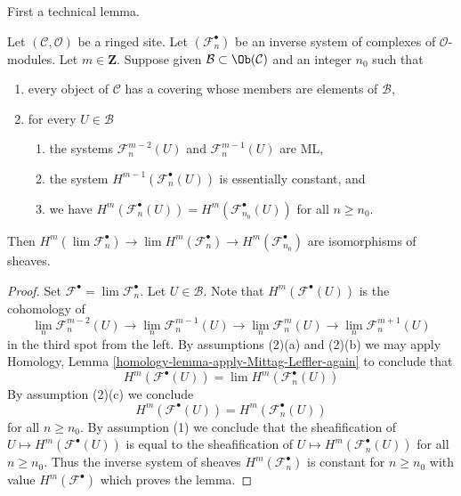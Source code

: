 \noindent
First a technical lemma.

\begin{lemma}
\label{lemma-inverse-limit-complexes}
Let $(\mathcal{C}, \mathcal{O})$ be a ringed site.
Let $(\mathcal{F}_n^\bullet)$
be an inverse system of complexes of $\mathcal{O}$-modules.
Let $m \in \mathbf{Z}$. Suppose given $\mathcal{B} \subset \Ob(\mathcal{C})$
and an integer $n_0$ such that
\begin{enumerate}
\item every object of $\mathcal{C}$ has a covering whose members are
elements of $\mathcal{B}$,
\item for every $U \in \mathcal{B}$
\begin{enumerate}
\item the systems
$\mathcal{F}_n^{m - 2}(U)$ and $\mathcal{F}_n^{m - 1}(U)$ are ML,
\item the system $H^{m - 1}(\mathcal{F}_n^\bullet(U))$ is essentially
constant, and
\item we have
$H^m(\mathcal{F}_n^\bullet(U)) = H^m(\mathcal{F}_{n_0}^\bullet(U))$
for all $n \geq n_0$.
\end{enumerate}
\end{enumerate}
Then
$H^m(\lim \mathcal{F}_n^\bullet) \to \lim H^m(\mathcal{F}_n^\bullet) \to
H^m(\mathcal{F}_{n_0}^\bullet)$
are isomorphisms of sheaves.
\end{lemma}

\begin{proof}
Set $\mathcal{F}^\bullet = \lim \mathcal{F}_n^\bullet$. Let
$U \in \mathcal{B}$. Note that $H^m(\mathcal{F}^\bullet(U))$ is the
cohomology of
$$
\lim_n \mathcal{F}_n^{m - 2}(U) \to
\lim_n \mathcal{F}_n^{m - 1}(U) \to
\lim_n \mathcal{F}_n^m(U) \to
\lim_n \mathcal{F}_n^{m + 1}(U)
$$
in the third spot from the left. By assumptions (2)(a) and (2)(b)
we may apply
Homology, Lemma \ref{homology-lemma-apply-Mittag-Leffler-again}
to conclude that
$$
H^m(\mathcal{F}^\bullet(U)) = \lim H^m(\mathcal{F}_n^\bullet(U))
$$
By assumption (2)(c) we conclude
$$
H^m(\mathcal{F}^\bullet(U)) = H^m(\mathcal{F}_n^\bullet(U))
$$
for all $n \geq n_0$. By assumption (1) we conclude that the sheafification of
$U \mapsto H^m(\mathcal{F}^\bullet(U))$ is equal to the sheafification
of $U \mapsto H^m(\mathcal{F}_n^\bullet(U))$ for all $n \geq n_0$.
Thus the inverse system of sheaves $H^m(\mathcal{F}_n^\bullet)$ is
constant for $n \geq n_0$ with value $H^m(\mathcal{F}^\bullet)$ which
proves the lemma.
\end{proof}


